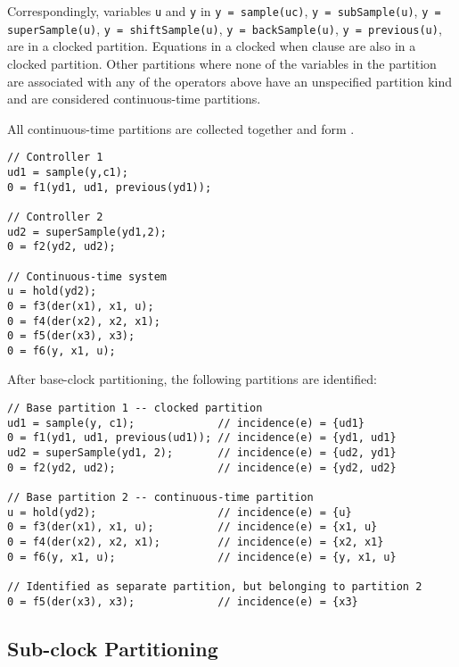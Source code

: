 Correspondingly, variables \lstinline!u! and \lstinline!y! in
\lstinline!y = sample(uc)!,
\lstinline!y = subSample(u)!,
\lstinline!y = superSample(u)!,
\lstinline!y = shiftSample(u)!,
\lstinline!y = backSample(u)!,
\lstinline!y = previous(u)!,
are in a clocked partition.
Equations in a clocked when clause are also in a clocked partition.
Other partitions where none of the variables in the partition are associated with any of the operators above have an unspecified partition kind and are considered continuous-time partitions.

All continuous-time partitions are collected together and form .

\begin{example}
\begin{lstlisting}[language=modelica]
// Controller 1
ud1 = sample(y,c1);
0 = f1(yd1, ud1, previous(yd1));

// Controller 2
ud2 = superSample(yd1,2);
0 = f2(yd2, ud2);

// Continuous-time system
u = hold(yd2);
0 = f3(der(x1), x1, u);
0 = f4(der(x2), x2, x1);
0 = f5(der(x3), x3);
0 = f6(y, x1, u);
\end{lstlisting}

After base-clock partitioning, the following partitions are identified:
\begin{lstlisting}[language=modelica]
// Base partition 1 -- clocked partition
ud1 = sample(y, c1);             // incidence(e) = {ud1}
0 = f1(yd1, ud1, previous(ud1)); // incidence(e) = {yd1, ud1}
ud2 = superSample(yd1, 2);       // incidence(e) = {ud2, yd1}
0 = f2(yd2, ud2);                // incidence(e) = {yd2, ud2}

// Base partition 2 -- continuous-time partition
u = hold(yd2);                   // incidence(e) = {u}
0 = f3(der(x1), x1, u);          // incidence(e) = {x1, u}
0 = f4(der(x2), x2, x1);         // incidence(e) = {x2, x1}
0 = f6(y, x1, u);                // incidence(e) = {y, x1, u}

// Identified as separate partition, but belonging to partition 2
0 = f5(der(x3), x3);             // incidence(e) = {x3}
\end{lstlisting}
\end{example}

\subsection{Sub-clock Partitioning}\label{sub-clock-partitioning}

